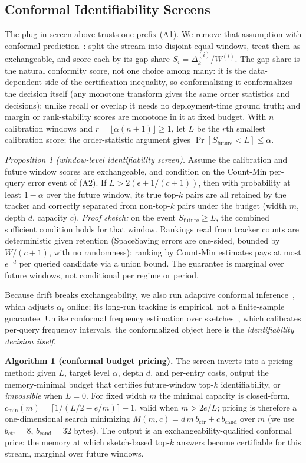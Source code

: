 \documentclass[conference]{IEEEtran}
\begin{document}
\subsection{Conformal Identifiability Screens}
The plug-in screen above trusts one prefix (A1). We remove that assumption with conformal prediction~\cite{vovk2005algorithmic}: split the stream into disjoint equal windows, treat them as exchangeable, and score each by its gap share $S_i=\Delta_k^{(i)}/W^{(i)}$. The gap share is the natural conformity score, not one choice among many: it is the data-dependent side of the certification inequality, so conformalizing it conformalizes the decision itself (any monotone transform gives the same order statistics and decisions); unlike recall or overlap it needs no deployment-time ground truth; and margin or rank-stability scores are monotone in it at fixed budget. With $n$ calibration windows and $r=\lfloor\alpha(n{+}1)\rfloor\geq 1$, let $L$ be the $r$th smallest calibration score; the order-statistic argument gives $\Pr[S_{\mathrm{future}} < L] \leq \alpha$.

\noindent\emph{Proposition 1 (window-level identifiability screen).} Assume the calibration and future window scores are exchangeable, and condition on the Count-Min per-query error event of (A2). If $L > 2(\epsilon + 1/(c{+}1))$, then with probability at least $1-\alpha$ over the future window, its true top-$k$ pairs are all retained by the tracker and correctly separated from non-top-$k$ pairs under the budget (width $m$, depth $d$, capacity $c$). \emph{Proof sketch:} on the event $S_{\mathrm{future}}\geq L$, the combined sufficient condition holds for that window. Rankings read from tracker counts are deterministic given retention (SpaceSaving errors are one-sided, bounded by $W/(c{+}1)$, with no randomness); ranking by Count-Min estimates pays at most $e^{-d}$ per queried candidate via a union bound. The guarantee is marginal over future windows, not conditional per regime or period.

Because drift breaks exchangeability, we also run adaptive conformal inference~\cite{gibbs2021adaptive}, which adjusts $\alpha_t$ online; its long-run tracking is empirical, not a finite-sample guarantee. Unlike conformal frequency estimation over sketches~\cite{sesia2022conformal}, which calibrates per-query frequency intervals, the conformalized object here is the \emph{identifiability decision itself}.

\noindent\textbf{Algorithm 1 (conformal budget pricing).} The screen inverts into a pricing method: given $L$, target level $\alpha$, depth $d$, and per-entry costs, output the memory-minimal budget that certifies future-window top-$k$ identifiability, or \emph{impossible} when $L=0$. For fixed width $m$ the minimal capacity is closed-form, $c_{\min}(m)=\lceil 1/(L/2-e/m)\rceil-1$, valid when $m>2e/L$; pricing is therefore a one-dimensional search minimizing $M(m,c)=d\,m\,b_{\mathrm{ctr}}+c\,b_{\mathrm{cand}}$ over $m$ (we use $b_{\mathrm{ctr}}=8$, $b_{\mathrm{cand}}=32$ bytes). The output is an exchangeability-qualified conformal price: the memory at which sketch-based top-$k$ answers become certifiable for this stream, marginal over future windows.
\end{document}
